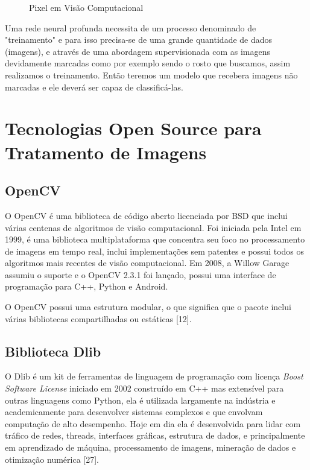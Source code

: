 
\begin{figure}[H]
	\centering
	\caption{Pixel em Visão Computacional}
	\def\svgwidth{10cm}
	
	\label{fig:pixel}
\end{figure}

Uma rede neural profunda necessita de um processo denominado de "treinamento" e para isso precisa-se de uma grande quantidade de dados (imagens), e através de uma abordagem supervisionada com as imagens devidamente marcadas como por exemplo sendo o rosto que buscamos, assim realizamos o treinamento. Então teremos um modelo que recebera imagens não marcadas e ele deverá ser capaz de classificá-las.
\section{Tecnologias Open Source para Tratamento de Imagens}

\subsection{OpenCV}
O OpenCV é uma biblioteca de código aberto licenciada por BSD que inclui várias centenas de algoritmos de visão computacional.
Foi iniciada pela Intel em 1999, é uma biblioteca multiplataforma que concentra seu foco no processamento de imagens em tempo real, inclui implementações sem patentes e possui todos os algoritmos mais recentes de visão computacional. Em 2008, a Willow Garage assumiu o suporte e o OpenCV 2.3.1 foi lançado, possui uma interface de programação para C++, Python e Android.

O OpenCV possui uma estrutura modular, o que significa que o pacote inclui várias bibliotecas compartilhadas ou estáticas [12].
\subsection{Biblioteca Dlib}
O Dlib é um kit de ferramentas de linguagem de programação com licença \textit{Boost Software License} iniciado em 2002 construído em C++ mas extensível para outras linguagens como Python, ela é utilizada largamente na indústria e academicamente para desenvolver sistemas complexos e que envolvam computação de alto desempenho. Hoje em dia ela é desenvolvida para lidar com tráfico de redes, threads, interfaces gráficas, estrutura de dados, e principalmente em aprendizado de máquina, processamento de imagens, mineração de dados e otimização numérica [27].
